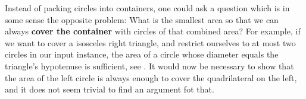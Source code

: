 \documentclass[a4paper,style=print,bibliography=totoc,nexus,lnum,extramargin]{tubsbook}
\begin{document}
Instead of packing circles into containers, one could ask a question which is in some sense the opposite problem: What is the smallest area so that we can always \textbf{cover the container} with circles of that combined area? For example, if we want to cover a isosceles right triangle, and restrict ourselves to at most two circles in our input instance, the area of a circle whose diameter equals the triangle's hypotenuse is sufficient, see . It would now be necessary to show that the area of the left circle is always enough to cover the quadrilateral on the left, and it does not seem trivial to find an argument fot that.


\printbibliography
\end{document}
